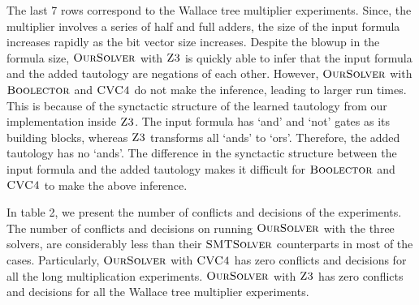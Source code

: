 The last 7 rows correspond to the Wallace tree multiplier experiments. Since, the multiplier involves a series of half and full adders, the size of the input formula increases rapidly as the bit vector size increases. Despite the blowup in the formula size, $\textsc{OurSolver}$ with $\textsc{Z3}$ is quickly able to infer that the input formula and the added tautology are negations of each other. However, $\textsc{OurSolver}$ with $\textsc{Boolector}$ and $\textsc{CVC4}$ do not make the inference, leading to larger run times. This is because of the synctactic structure of the learned tautology from our implementation inside $\textsc{Z3}$. The input formula has `and' and `not' gates as its building blocks, whereas $\textsc{Z3}$ transforms all `ands' to `ors'. Therefore, the added tautology has no `ands'. The difference in the synctactic structure between the input formula and the added tautology makes it difficult for $\textsc{Boolector}$ and $\textsc{CVC4}$ to make the above inference. 

In table 2, we present the number of conflicts and decisions of the experiments. The number of conflicts and decisions on running $\textsc{OurSolver}$ with the three solvers, are considerably less than their $\textsc{SMTSolver}$ counterparts in most of the cases. Particularly, $\textsc{OurSolver}$ with $\textsc{CVC4}$ has zero conflicts and decisions for all the long multiplication experiments. $\textsc{OurSolver}$ with $\textsc{Z3}$ has zero conflicts and decisions for all the Wallace tree multiplier experiments.


%








